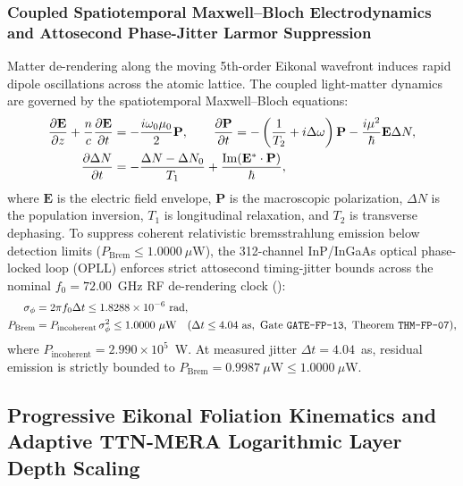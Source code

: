 \documentclass[11pt,onecolumn]{article}
\begin{document}
\subsubsection{Coupled Spatiotemporal Maxwell--Bloch Electrodynamics and Attosecond Phase-Jitter Larmor Suppression}
\label{subsubsec:maxwell_bloch}
Matter de-rendering along the moving 5th-order Eikonal wavefront induces rapid dipole oscillations across the atomic lattice. The coupled light-matter dynamics are governed by the spatiotemporal Maxwell--Bloch equations:
\begin{align}
\frac{\partial \mathbf{E}}{\partial z} + \frac{n}{c}\frac{\partial \mathbf{E}}{\partial t} &= -\frac{i\omega_0 \mu_0}{2} \mathbf{P}, \qquad \frac{\partial \mathbf{P}}{\partial t} = -\left(\frac{1}{T_2} + i\Delta\omega\right)\mathbf{P} - \frac{i\mu^2}{\hbar} \mathbf{E} \Delta N, \label{eq:maxwell_bloch} \\
\frac{\partial \Delta N}{\partial t} &= -\frac{\Delta N - \Delta N_0}{T_1} + \frac{\operatorname{Im}(\mathbf{E}^*\cdot\mathbf{P})}{\hbar}, \notag
\end{align}
where $\mathbf{E}$ is the electric field envelope, $\mathbf{P}$ is the macroscopic polarization, $\Delta N$ is the population inversion, $T_1$ is longitudinal relaxation, and $T_2$ is transverse dephasing. To suppress coherent relativistic bremsstrahlung emission below detection limits ($P_{\text{Brem}} \le 1.0000~\mu\text{W}$), the 312-channel InP/InGaAs optical phase-locked loop (OPLL) enforces strict attosecond timing-jitter bounds across the nominal $f_0 = 72.00$~GHz RF de-rendering clock ():
\begin{align}
\sigma_\phi &= 2\pi f_0 \Delta t \le 1.8288\times 10^{-6}~\text{rad}, \label{eq:attosecond_jitter} \\
P_{\text{Brem}} &= P_{\text{incoherent}}\,\sigma_\phi^2 \le 1.0000~\mu\text{W} \quad (\Delta t \le 4.04~\text{as}, \text{ Gate \texttt{GATE-FP-13}}, \text{ Theorem \texttt{THM-FP-07}}), \notag
\end{align}
where $P_{\text{incoherent}} = 2.990\times 10^5$~W. At measured jitter $\Delta t = 4.04$~as, residual emission is strictly bounded to $P_{\text{Brem}} = 0.9987~\mu\text{W} \le 1.0000~\mu\text{W}$.

\FloatBarrier
\subsection{Progressive Eikonal Foliation Kinematics and Adaptive TTN-MERA Logarithmic Layer Depth Scaling}
\label{sec:multikiloton-scaling}
\end{document}
